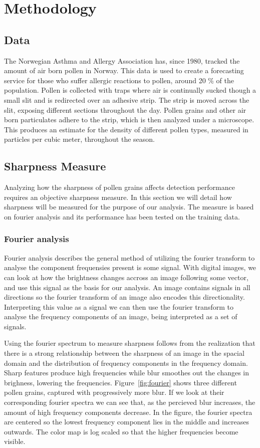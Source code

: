 \chapter{Methodology}\label{cha:method}

\section{Data}\label{sec:dataset}
The Norwegian Asthma and Allergy Association has, since 1980, tracked the amount of air born pollen in Norway.
This data is used to create a forecasting service for those who suffer allergic reactions to pollen, around 20 \% of the population.
Pollen is collected with traps where air is continually sucked though a small slit and is redirected over an adhesive strip.
The strip is moved across the slit, exposing different sections throughout the day.
Pollen grains and other air born particulates adhere to the strip, which is then analyzed under a microscope.
This produces an estimate for the density of different pollen types, measured in particles per cubic meter, throughout the season. 


\section{Sharpness Measure}\label{sec:method-sharpness}
Analyzing how the sharpness of pollen grains affects detection performance requires an objective sharpness measure.
In this section we will detail how sharpness will be measured for the purpose of our analysis.
The measure is based on fourier analysis and its performance has been tested on the training data.

\subsection{Fourier analysis}
Fourier analysis describes the general method of utilizing the fourier transform to analyse the component frequensies present is some signal.
With digital images, we can look at how the brightness changes accross an image following some vector, and use this signal as the basis for our analysis.
An image contains signals in all directions so the fourier transform of an image also encodes this directionality.
Interpreting this value as a signal we can then use the fourier transform to analyse the frequency components of an image, being interpreted as a set of signals.

Using the fourier spectrum to measure sharpness follows from the realization that there is a strong relationship between the sharpness of an image in the spacial domain and the distribution of frequency components in the frequency domain.
Sharp features produce high frequencies while blur smoothes out the changes in brighness, lowering the frequencies.
Figure~\ref{fig:fourier} shows three different pollen grains, captured with progressively more blur.
If we look at their corresponding fourier spectra we can see that, as the percieved blur increases, the amount of high frequency components decrease.
In the figure, the fourier spectra are centered so the lowest frequency component lies in the middle and increases outwards.
The color map is log scaled so that the higher frequencies become visible.

